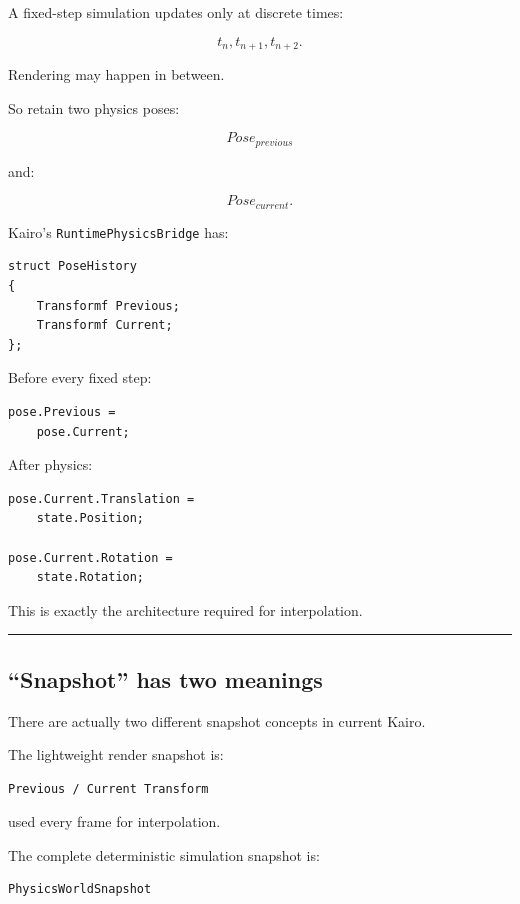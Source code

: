 A fixed-step simulation updates only at discrete times:

\[
t_n,
t_{n+1},
t_{n+2}.
\]

Rendering may happen in between.

So retain two physics poses:

\[
Pose_{previous}
\]

and:

\[
Pose_{current}.
\]

Kairo's \texttt{RuntimePhysicsBridge} has:

\begin{verbatim}
struct PoseHistory
{
    Transformf Previous;
    Transformf Current;
};
\end{verbatim}

Before every fixed step:

\begin{verbatim}
pose.Previous =
    pose.Current;
\end{verbatim}

After physics:

\begin{verbatim}
pose.Current.Translation =
    state.Position;

pose.Current.Rotation =
    state.Rotation;
\end{verbatim}

This is exactly the architecture required for interpolation.

\begin{center}\rule{0.5\linewidth}{0.5pt}\end{center}

\subsection{``Snapshot'' has two meanings}\label{06-engine-ii-ch037-snapshot-has-two-meanings}

There are actually two different snapshot concepts in current Kairo.

The lightweight render snapshot is:

\begin{verbatim}
Previous / Current Transform
\end{verbatim}

used every frame for interpolation.

The complete deterministic simulation snapshot is:

\begin{verbatim}
PhysicsWorldSnapshot
\end{verbatim}

